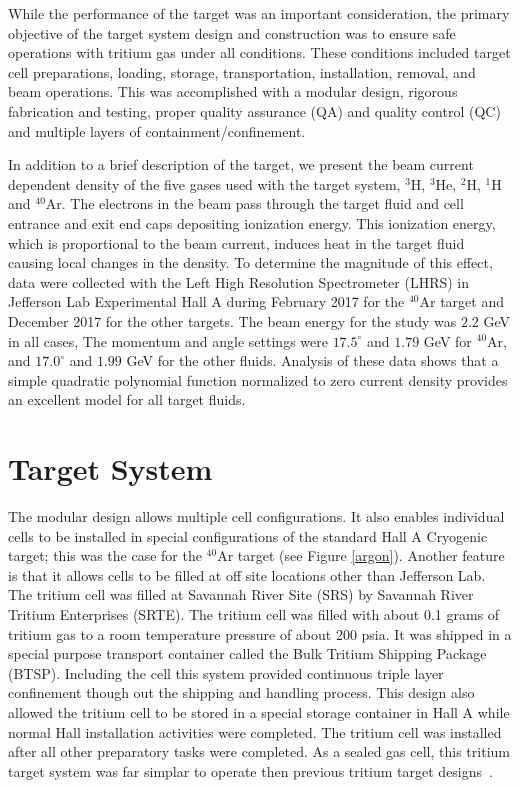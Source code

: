 \documentclass[final,5p,times,twocolumn]{elsarticle}
\begin{document}
While the performance of the target was an important consideration, the primary objective of the target system design and construction 
was to ensure safe operations with tritium gas under all conditions.   These conditions included 
target cell preparations, loading, storage, transportation, installation, removal, and beam operations. This was accomplished with a 
modular design, rigorous fabrication and testing, proper quality assurance (QA) and quality control (QC) and multiple layers of 
containment/confinement.    

 
In addition to a brief description of the target, we present the beam current dependent density of the five gases used 
with the target system, $^{3}$H, $^{3}$He, $^{2}$H, $^{1}$H and $^{40}$Ar. The electrons in the beam pass through the 
target fluid and cell entrance and exit end caps depositing ionization energy. This ionization energy, which is proportional 
to the beam current, induces heat in the target fluid causing local changes in the density. To determine the magnitude of this 
effect, data were collected with the Left High Resolution Spectrometer (LHRS) in Jefferson Lab Experimental Hall A during 
February 2017 for the $^{40}$Ar target and December 2017 for the other targets. The beam energy for the study was $2.2$ GeV 
in all cases, The momentum and angle settings were $17.5 ^\circ $ and $1.79$ GeV for $^{40}$Ar, and $17.0 ^\circ $ and $1.99$ GeV 
for the other fluids. Analysis of these data shows that a simple quadratic polynomial function normalized to zero current density 
provides an excellent model for all target fluids.

\section{Target System}

The modular design allows multiple cell configurations. It also enables individual cells to be installed in special configurations 
of the standard Hall A Cryogenic target; this was the case for the $^{40}$Ar target (see Figure \ref{argon}). Another feature is that 
it allows cells to be filled at off site locations other than Jefferson Lab.  The tritium cell was filled at Savannah River 
Site (SRS) by Savannah River Tritium Enterprises (SRTE).  
The tritium cell was filled with about 0.1 grams of tritium gas to a room temperature pressure of about 200 psia. It was shipped 
in a special purpose transport container called the Bulk Tritium Shipping Package (BTSP). Including the cell this system provided 
continuous triple layer confinement though out the shipping and handling process. This design also allowed the tritium cell to be 
stored in a special storage container in Hall A while normal Hall installation activities were completed. The tritium cell was 
installed after all other preparatory tasks were completed.     
As a sealed gas cell, this tritium target system was far simplar to operate then previous tritium target designs~\cite{Beck:1989bi}. 
\end{document}
